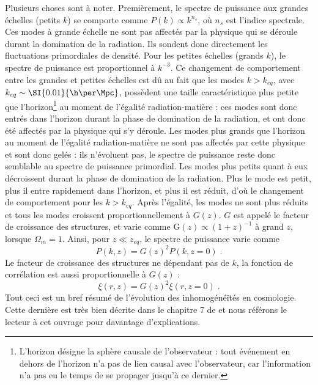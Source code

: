 Plusieurs choses sont à noter. Premièrement, le spectre de puissance aux grandes échelles (petits $k$) se comporte comme $P(k) \propto k^{n_s}$, où $n_s$ est l'indice spectrale.
Ces modes à grande échelle ne sont pas affectés par la physique qui se déroule durant la domination de la radiation. Ils sondent donc directement les fluctuations primordiales de densité.
Pour les petites échelles (grands $k$), le spectre de puissance est proportionnel à $k^{-3}$. Ce changement de comportement entre les grandes et petites échelles est dû au fait que les modes $k > k_{eq}$, avec  $k_{eq} \sim \SI{0.01}{\h\per\Mpc}$, possèdent une taille caractéristique plus petite que l'horizon\footnote{L'horizon désigne la sphère causale de l'observateur : tout événement en dehors de l'horizon n'a pas de lien causal avec l'observateur, car l'information n'a pas eu le temps de se propager jusqu'à ce dernier.} au moment de l'égalité radiation-matière : ces modes sont donc entrés dans l'horizon durant la phase de domination de la radiation, et ont donc été affectés par la physique qui s'y déroule.
Les modes plus grands que l'horizon au moment de l'égalité radiation-matière ne sont pas affectés par cette physique et sont donc gelés : ils n'évoluent pas, le spectre de puissance reste donc semblable au spectre de puissance primordial.
Les modes plus petits quant à eux décroissent durant la phase de domination de la radiation. Plus le mode est petit, plus il entre rapidement dans l'horizon, et plus il est réduit, d'où le changement de comportement pour les $k > k_{eq}$. Après l'égalité, les modes ne sont plus réduits et tous les modes croissent proportionnellement à $G(z)$. 
$G$ est appelé le facteur de croissance des structures, et varie comme $\mathrm{G}(z) \propto (1+z)^{-1}$ à grand $z$, lorsque $\Omega_m = 1$. Ainsi, pour $z \ll z_{eq}$, le spectre de puissance varie comme
\begin{equation}
  \label{eq:pow_spec_vs_z}
  P(k,z) = G(z)^{2} P(k,z=0)  \; .
\end{equation}
Le facteur de croissance des structures ne dépendant pas de $k$, la fonction de corrélation est aussi proportionnelle à $G(z)$ :
\begin{equation}
  \label{eq:cf_vs_z}
  \xi(r, z) = G(z)^{2} \xi(r, z=0) \; .
\end{equation}
Tout ceci est un bref résumé de l'évolution des inhomogénéïtés en cosmologie. Cette dernière est très bien décrite dans le chapitre 7 de \textcite{Dodelson2003} et nous référons le lecteur à cet ouvrage pour davantage d'explications.


